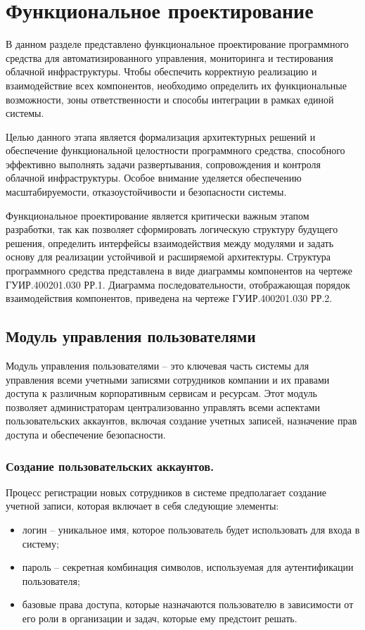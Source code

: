 \section{Функциональное проектирование}

В данном разделе представлено функциональное проектирование программного средства для автоматизированного управления, мониторинга и тестирования облачной инфраструктуры. Чтобы обеспечить корректную реализацию и взаимодействие всех компонентов, необходимо определить их функциональные возможности, зоны ответственности и способы интеграции в рамках единой системы.

Целью данного этапа является формализация архитектурных решений и обеспечение функциональной целостности программного средства, способного эффективно выполнять задачи развертывания, сопровождения и контроля облачной инфраструктуры. Особое внимание уделяется обеспечению масштабируемости, отказоустойчивости и безопасности системы.

Функциональное проектирование является критически важным этапом разработки, так как позволяет сформировать логическую структуру будущего решения, определить интерфейсы взаимодействия между модулями и задать основу для реализации устойчивой и расширяемой архитектуры. Структура программного средства представлена в виде диаграммы компонентов на чертеже ГУИР.400201.030 РР.1. Диаграмма последовательности, отображающая порядок взаимодействия компонентов, приведена на чертеже ГУИР.400201.030 РР.2.

\subsection{Модуль управления пользователями}
\label{sec:user_management_functionality}

Модуль управления пользователями -- это ключевая часть системы для управления всеми учетными записями сотрудников компании и их правами доступа к различным корпоративным сервисам и ресурсам. Этот модуль позволяет администраторам централизованно управлять всеми аспектами пользовательских аккаунтов, включая создание учетных записей, назначение прав доступа и обеспечение безопасности.

\subsubsection{Создание пользовательских аккаунтов.}
Процесс регистрации новых сотрудников в системе предполагает создание учетной записи, которая включает в себя следующие элементы:
\begin{itemize}
    \item логин -- уникальное имя, которое пользователь будет использовать для входа в систему;
    \item пароль -- секретная комбинация символов, используемая для аутентификации пользователя;
    \item базовые права доступа, которые назначаются пользователю в зависимости от его роли в организации и задач, которые ему предстоит решать.
\end{itemize}

